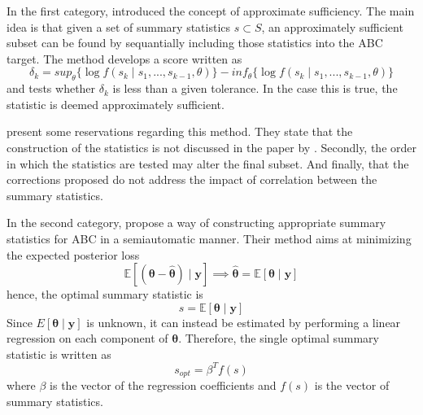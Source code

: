 \documentclass[runningheads]{llncs}
\begin{document}
In the first category, \citet{Joyce2008} introduced the concept
of approximate sufficiency. The main idea is that given a set
of summary statistics $s \subset S$, an approximately sufficient subset can
be found by sequantially including those statistics into the ABC
target. The method develops a score written as
\begin{equation}
\delta_k = sup_\theta \{
\log f(s_k \mid s_1,...,s_{k-1},\theta)
\}
- inf_\theta\{
\log f(s_k \mid s_1,...,s_{k-1},\theta)
\}
\end{equation}
and tests whether $\delta_k$ is less than a given tolerance. In the
case this is true, the statistic is deemed approximately sufficient.

\citet{Marin2012} present some reservations regarding this method.
They state that the construction of the statistics is not
discussed in the paper by \citet{Joyce2008}. Secondly, the
order in which the statistics are tested may alter the final subset.
And finally, that the corrections proposed do not address the impact
of correlation between the summary statistics.

In the second category,
\citet{fearnhead2010constructing} propose a way of constructing
appropriate summary statistics for ABC in a semiautomatic manner.
Their method aims at minimizing the expected posterior loss
\begin{equation}
\mathbb E[(\bm\theta - \bm{\hat\theta})\mid \bm y]
\implies
\bm {\hat\theta} = \mathbb E[\bm\theta \mid \bm y]
\end{equation}
hence, the optimal summary statistic is
\begin{equation}
s = \mathbb E[\bm \theta \mid \bm y]
\end{equation}
Since $E[\bm \theta \mid \bm y]$ is unknown, it can instead
be estimated by performing a linear regression on each
component of $\bm \theta$. Therefore, the single optimal
summary statistic is written as
\begin{equation}
s_{opt} =  \beta^T f(s)
\end{equation}
where $\beta$ is the vector of the regression coefficients and
$f(s)$ is the vector of summary statistics.





%
%
%


%
\end{document}
